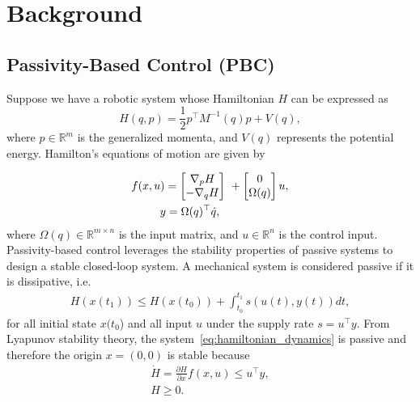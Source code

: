 
\section{Background}

\subsection{Passivity-Based Control (PBC)}

Suppose we have a robotic system whose Hamiltonian $H$ can be expressed as
%
\begin{equation}
    H(q,p) = \frac{1}{2} p^\top M^{-1}(q) p + V(q),
    \label{eq:system_hamiltonian}
\end{equation}
%
where $p \in \mathbb{R}^m$ is the generalized momenta, and $V(q)$ represents the
potential energy. Hamilton's equations of motion are given by

\begin{align}
    \begin{split}  
      f(x, u) &= \bmat{\nabla_pH \\ -\nabla_qH}\ + \bmat{0 \\ \Omega(q)}u, \\
      &\hspace{-0.15cm} y = \Omega(q)^\top \dot{q},
    \end{split}
    \label{eq:hamiltonian_dynamics}
\end{align}
\noindent where $\Omega(q) \in \mathbb{R}^{m \times n}$ is the input matrix, and $u
\in \mathbb{R}^{n}$ is the control input.
%
%
Passivity-based control leverages the stability properties of passive systems to
design a stable closed-loop system.
%
A mechanical system is considered passive if it is dissipative, i.e.
\begin{align}
  H(x(t_1)) \leq H(x(t_0)) + \int_{t_0}^{t_1} s(u(t), y(t)) dt,
\end{align}
\noindent for all initial state $x(t_0$) and all input $u$ under the supply rate
$s = u^\top y$.
%
From Lyapunov stability theory, the system~\eqref{eq:hamiltonian_dynamics} is
passive and therefore the origin $x = (0, 0)$ is stable because 
\begin{equation*}
  \begin{gathered}
    \dot{H} = \frac{\partial H}{\partial x} f(x, u) \leq u^\top y, \\
    H \geq 0.
  \end{gathered}
\end{equation*}

